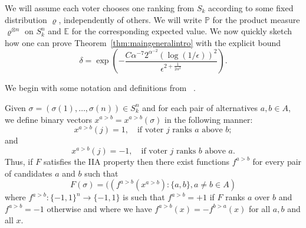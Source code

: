 \documentclass[11pt]{amsart}
\newcommand{\E}{\mathbb{E}}
\newcommand{\PP}{\mathbb{P}}
\newcommand{\eps}{\epsilon}
\newcommand{\1}{\mathbf{1}}
\def\E{{\mathbb E}}
\theoremstyle{definition}
\theoremstyle{plain}
\newtheorem{theorem}[example]{Theorem}
\theoremstyle{remark}
\numberwithin{equation}{section}
\begin{document}
We will assume each voter chooses one ranking from $S_k$ according to some fixed distribution $\varrho$, independently of others. We will write $\PP$ for the product measure $\varrho^{\otimes n}$ on $S_k^n$
and $\E$ for the corresponding expected value.
We now quickly sketch how one can prove Theorem~\ref{thm:maingeneralintro} with the explicit bound 
\begin{equation}\label{delta_dep_eps}
 \delta = \exp \left ( - \frac{C \alpha^{-7}2^{\alpha^{-2}}  ( \log(1/\eps))^2}{\eps^{2+\frac{1}{2\alpha^2}}}\right).
 \end{equation}


We begin with some notation and definitions from ~\cite{Mossel11}.

Given $\sigma = (\sigma(1),\ldots,\sigma(n)) \in S_k^n$ and for each pair of alternatives $a, b \in A$,  we define binary vectors $x^{a>b} = x^{a>b}(\sigma)$ in the following manner:
\[
 x^{a>b}(j) = 1, \quad \mbox{if voter } j \mbox{ ranks } a \mbox{ above } b; \]
 and
 \[ x^{a>b}(j) = -1, \quad \mbox{if voter } j \mbox{ ranks } b \mbox{ above } a.
\]
 Thus, if $F$ satisfies the IIA property then there exist functions $f^{a>b}$ for every pair of candidates $a$ and $b$ such that
\[
F(\sigma) = ((f^{a>b}(x^{a>b}) : \{a,b\}, a \ne b \in A )
\]
where $f^{a>b} : \{-1, 1\}^n \to \{-1, 1\}$ is such that $f^{a>b}=+1$ if $F$ ranks $a$ over $b$ and $f^{a>b}=-1$ otherwise and where we have $f^{a>b}(x) = -f^{b>a}(x)$ for all $a,b$ and all $x$. 
\end{document}
